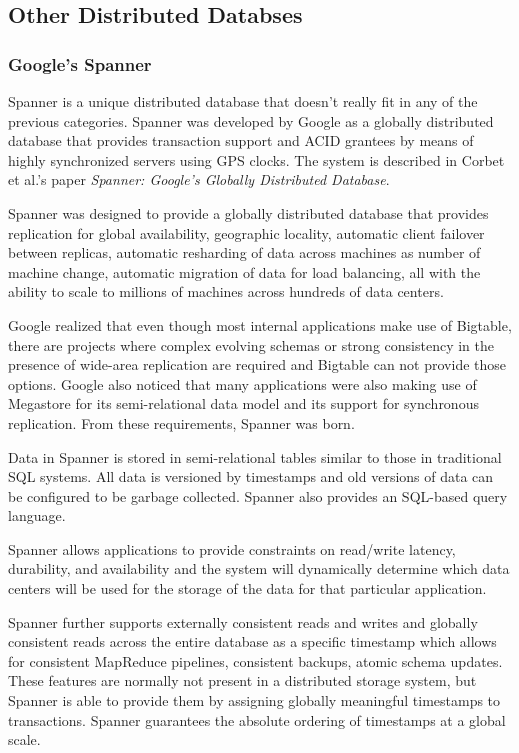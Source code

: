 \documentclass[]{article}
\begin{document}
\subsection{Other Distributed Databses}\label{ssec:misc}
\subsubsection{Google's Spanner}\label{sssec:googles-spanner}
Spanner is a unique distributed database that doesn't really fit in any of the previous categories. Spanner was developed by Google as a globally distributed database that provides transaction support and ACID grantees by means of highly synchronized servers using GPS clocks. The system is described in Corbet et al.'s paper  \textit{Spanner: Google's Globally Distributed Database}\cite{corbett_spanner:_2013}.

Spanner was designed to provide a globally distributed database that provides replication for global availability, geographic locality, automatic client failover between replicas, automatic resharding of data across machines as number of machine change, automatic migration of data for load balancing, all with the ability to scale to millions of machines across hundreds of data centers.

Google realized that even though most internal applications make use of Bigtable, there are projects where complex evolving schemas or strong consistency in the presence of wide-area replication are required and Bigtable can not provide those options. Google also noticed that many applications were also making use of Megastore for its semi-relational data model and its support for synchronous replication. From these requirements, Spanner was born.

Data in Spanner is stored in semi-relational tables similar to those in traditional SQL systems. All data is versioned by timestamps and old versions of data can be configured to be garbage collected. Spanner also provides an SQL-based query language.

Spanner allows applications to provide constraints on read/write latency, durability, and availability and the system will dynamically determine which data centers will be used for the storage of the data for that particular application.

Spanner further supports externally consistent reads and writes and globally consistent reads across the entire database as a specific timestamp which allows for consistent MapReduce pipelines, consistent backups, atomic schema updates. These features are normally not present in a distributed storage system, but Spanner is able to provide them by assigning globally meaningful timestamps to transactions. Spanner guarantees the absolute ordering of timestamps at a global scale.
\end{document}
